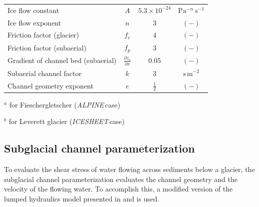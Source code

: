 \documentclass[draft]{agujournal2019}
\newcommand{\alpine}{\textit{ALPINE}\,}
\newcommand{\icesheet}{\textit{ICESHEET}\,}
\newcommand{\unit}[1]{$\mathrm{#1}$}
\begin{document}
\begin{table}[H]
\begin{tabular}{ l  c  c c }
    Ice flow constant &$A$& $5.3\times10^{-24}$ &\unit{Pa}$^{-n}$\,$s^{-1}$\\
    Ice flow exponent &$n$& $3$ &$\mathrm{(-)}$\\
    Friction factor (glacier) & $f_r$ & $4$ & $\mathrm{(-)}$ \\
    Friction factor (subaerial) & $f_p$ & $3$ & $\mathrm{(-)}$\\
    Gradient of channel bed (subaerial) &$\frac{\partial z_c}{\partial x}$ &$0.05$& $\mathrm{(-)}$\\
    Subaerial channel factor & $k$ &$3$ & $\mathrm{s\,m^{-2}}$\\
    Channel geometry exponent &$e$& $\frac{1}{2}$&$\mathrm{(-)}$ \\
    \hline
  \end{tabular}
  \label{table:vpm}

\end{table}
  $^a$ for Fieschergletscher (\alpine case)
  
  $^b$ for Leverett glacier (\icesheet case)

\subsection{Subglacial channel  parameterization}
\label{sect:sub_mode}

To evaluate the shear stress of water flowing across sediments below a glacier, the subglacial channel parameterization evaluates the channel geometry and the velocity of the flowing water.
To accomplish this, a modified version of  the lumped hydraulics model presented in  and  is used.
\end{document}

